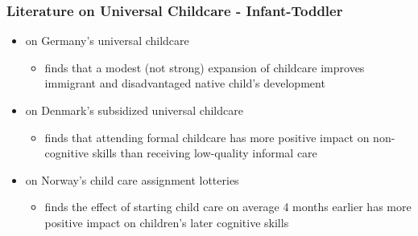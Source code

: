 \documentclass{beamer}
\title[]{}
\author[]{}
\institute[]{}
\date{\today}
\begin{document}
\begin{frame}
	\frametitle{Literature on Universal Childcare - Infant-Toddler}
	\begin{itemize}
	\item \citet{Felfe_Lalive_2015_Germany} on Germany's universal childcare
		\begin{itemize}
		\item finds that a modest (not strong) expansion of childcare improves immigrant and disadvantaged native child's development
		\end{itemize}
	\item \citet{Datta-Gupta_2010_Denmark} on Denmark's subsidized universal childcare
		\begin{itemize}
		\item finds that attending formal childcare has more positive impact on non-cognitive skills than receiving low-quality informal care 
		\end{itemize}
	\item \citet{Drange_Havnes_2014_Norway} on Norway's child care assignment lotteries
		\begin{itemize}
		\item finds the effect of starting child care on average 4 months earlier has more positive impact on children's later cognitive skills
		\end{itemize}
	\end{itemize}
\end{frame}
\end{document}
